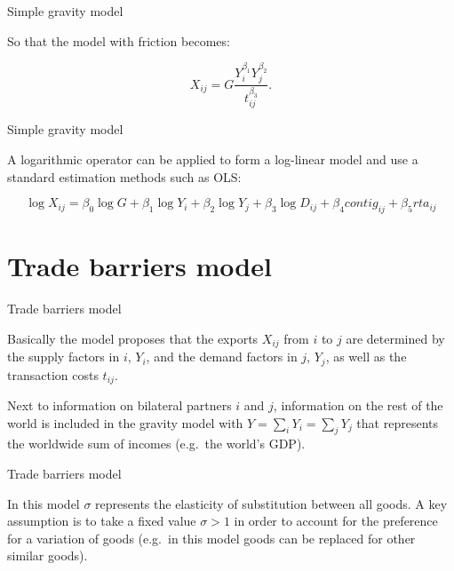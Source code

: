 \documentclass[ignorenonframetext,compress,aspectratio=169]{beamer}
\begin{document}
\begin{frame}{Simple gravity model}

So that the model with friction becomes:

\[
X_{ij}=G\frac{Y_{i}^{\beta_{1}}Y_{j}^{\beta_{2}}}{t_{ij}^{\beta_{3}}}.
\]

\end{frame}

\begin{frame}{Simple gravity model}

A logarithmic operator can be applied to form a log-linear model and use
a standard estimation methods such as OLS:

\[
\log X_{ij}=\beta_{0}\log G +\beta_{1}\log Y_{i}+\beta_{2}\log Y_{j}+\beta_{3}\log D_{ij}+\beta_{4}contig_{ij}+\beta_{5}rta_{ij}
\]

\end{frame}

\section{Trade barriers model}\label{trade-barriers-model}

\begin{frame}{Trade barriers model}

Basically the model proposes that the exports \(X_{ij}\) from \(i\) to
\(j\) are determined by the supply factors in \(i\), \(Y_{i}\), and the
demand factors in \(j\), \(Y_{j}\), as well as the transaction costs
\(t_{ij}\).

Next to information on bilateral partners \(i\) and \(j\), information
on the rest of the world is included in the gravity model with
\(Y=\sum_{i} Y_{i}= \sum_{j} Y_{j}\) that represents the worldwide sum
of incomes (e.g.~the world's GDP).

\end{frame}

\begin{frame}{Trade barriers model}

In this model \(\sigma\) represents the elasticity of substitution
between all goods. A key assumption is to take a fixed value
\(\sigma > 1\) in order to account for the preference for a variation of
goods (e.g.~in this model goods can be replaced for other similar
goods).

\end{frame}
\end{document}
